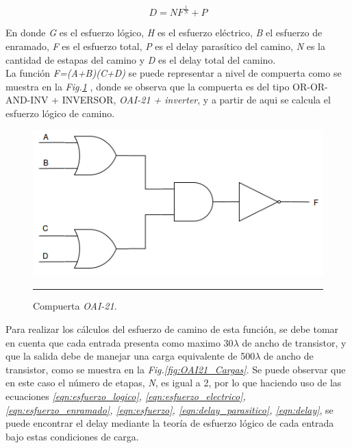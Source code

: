 \documentclass[12pt,a4paper]{article} %
\begin{document}
\begin{equation}\label{eqn:delay}
D = NF^{\frac{1}{N}} + P
\end{equation}

En donde \textit{G} es el esfuerzo lógico, \textit{H} es el esfuerzo eléctrico, \textit{B} el esfuerzo de enramado, \textit{F} es el esfuerzo total, \textit{P} es el delay parasítico del camino, \textit{N} es la cantidad de estapas del camino y \textit{D} es el delay total del camino.\\

La función \textit{F=(A+B)(C+D)} se puede representar a nivel de compuerta como se muestra en la \textit{Fig.\ref{fig:OAI21}} , donde se observa que la compuerta es del tipo OR-OR-AND-INV + INVERSOR, \textit{OAI-21 + inverter}, y a partir de aqui se calcula el esfuerzo lógico de camino.\\

\begin{figure}[htbp]
  \centering
    \includegraphics[scale=0.5]{./OAI21.png}
    \rule{35em}{0.5pt}
  \caption[IdealvsSim]{Compuerta \textit{OAI-21}.}
  \label{fig:OAI21}
\end{figure}

Para realizar los cálculos del esfuerzo de camino de esta función, se debe tomar en cuenta que cada entrada presenta como maximo 30$\lambda$ de ancho de transistor, y que la salida debe de manejar una carga equivalente de 500$\lambda$ de ancho de transistor, como se muestra en la \textit{Fig.\ref{fig:OAI21_Cargas}}. Se puede observar que en este caso el número de etapas, \textit{N}, es igual a 2, por lo que haciendo uso de las ecuaciones \textit{\ref{eqn:esfuerzo_logico}, \ref{eqn:esfuerzo_electrico}, \ref{eqn:esfuerzo_enramado}, \ref{eqn:esfuerzo}, \ref{eqn:delay_parasitico}, \ref{eqn:delay}}, se puede encontrar el delay mediante la teoría de esfuerzo lógico de cada entrada bajo estas condiciones de carga.\\
\end{document}
